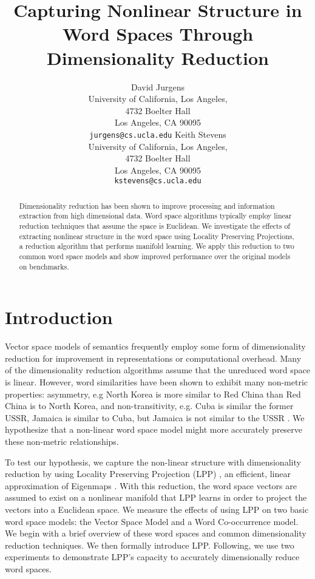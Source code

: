 \documentclass[11pt]{article}
\title{Capturing Nonlinear Structure in Word Spaces Through Dimensionality
  Reduction }
\author{ David Jurgens\\
  University of California, Los Angeles, \\
  4732 Boelter Hall \\
  Los Angeles, CA 90095 \\
  {\tt jurgens@cs.ucla.edu} \And
  Keith Stevens\\
  University of California, Los Angeles, \\
  4732 Boelter Hall \\
  Los Angeles, CA 90095 \\
  {\tt kstevens@cs.ucla.edu}}
\date{}
\begin{document}
\maketitle

\begin{abstract}
Dimensionality reduction has been shown to improve processing and information
extraction from high dimensional data.
%
Word space algorithms typically employ linear reduction techniques that assume
the space is Euclidean.  We investigate the effects of extracting nonlinear
structure in the word space using Locality Preserving Projections, a reduction
algorithm that performs manifold learning.  We apply this reduction to two common
word space models and show improved performance over the original models on
benchmarks.
\end{abstract}


\section{Introduction}

Vector space models of semantics frequently employ some form of dimensionality
reduction for improvement in representations or computational overhead.
Many of the dimensionality reduction algorithms assume that the unreduced word
space is linear.  However, word similarities have been shown to exhibit many
non-metric properties: asymmetry, e.g North Korea is more similar to Red China
than Red China is to North Korea, and non-transitivity, e.g. Cuba is similar the
former USSR, Jamaica is similar to Cuba, but Jamaica is not similar to the USSR
\cite{tversky77features}.  We hypothesize that a non-linear word space model
might more accurately preserve these non-metric relationships.

To test our hypothesis, we capture the non-linear structure with dimensionality
reduction by using Locality Preserving Projection (LPP) \cite{he03locality}, an
efficient, linear approximation of Eigenmaps \cite{belkin02laplacian}.
With this reduction, the word space vectors are assumed to exist on a nonlinear
manifold that LPP learns in order to project the vectors into a Euclidean space.
We measure the effects of using LPP on two basic word space models: the Vector
Space Model and a Word Co-occurrence model.  We begin with a brief overview of
these word spaces and common dimensionality reduction techniques.  We then
formally introduce LPP.  Following, we use two experiments to demonstrate LPP's
capacity to accurately dimensionally reduce word spaces.
\end{document}
